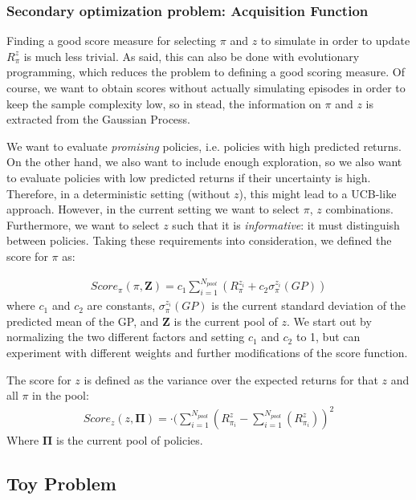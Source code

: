 \subsubsection{Secondary optimization problem: Acquisition Function}

Finding a good score measure for selecting $\pi$ and $z$ to simulate in order to update $R_{\pi}^z$ is much less trivial. As said, this can also be done with evolutionary programming, which reduces the problem to defining a good scoring measure. Of course, we want to obtain scores without actually simulating episodes in order to keep the sample complexity low, so in stead,  the information on $\pi$ and $z$ is extracted from the Gaussian Process. 

We want to evaluate \textit{promising} policies, i.e. policies with high predicted returns. On the other hand, we also want to include enough exploration, so we also want to evaluate policies with low predicted returns if their uncertainty is high. Therefore, in a deterministic setting (without $z$), this might lead to a UCB-like approach. %
However, in the current setting we want to select $\pi$, $z$ combinations. Furthermore, we want to select $z$ such that it is \textit{informative}: it must distinguish between policies. Taking these requirements into consideration, we defined the score for $\pi$ as: 

\begin{align}
Score_{\pi}(\pi ,\mathbf{Z}) = c_1 \sum_{i=1}^{N_{pool}} (R_{\pi}^{z_i} + c_2 \sigma_{\pi}^{z_i}(GP)) 
\label{score}
\end{align}
where $c_1$ and $c_2$ are constants, $\sigma_{\pi}^{z_i}(GP)$ is the current standard deviation of the predicted mean of the GP, and $\mathbf{Z}$ is the current pool of $z$. We start out by normalizing the two different factors and setting $c_1$ and $c_2$ to 1, but can experiment with different weights and further modifications of the score function.

The score for $z$ is defined as the variance over the expected returns for that $z$ and all $\pi$ in the pool:
\begin{align}
Score_z(z, \mathbf{\Pi}) = \cdot (\sum_{i=1}^{N_{pool}}(R_{\pi_i}^z-\sum_{i=1}^{N_{pool}}(R_{\pi_i}^z) )^2
\label{score2}
\end{align}
Where $\mathbf{\Pi}$ is the current pool of policies. 

\subsection{Toy Problem}\label{toyprob}


